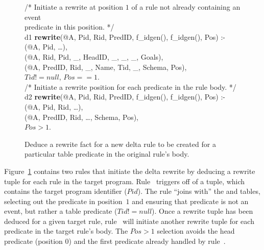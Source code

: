 \begin{figure}[!t]
\ssp
\centering
\begin{boxedminipage}{\linewidth}
/* Initiate a rewrite at position $1$ of a rule not already containing an event \\
   predicate in this position. */ \\
d1 {\bf rewrite}(@A, Pid, Rid, PredID, f\_idgen(), f\_idgen(), Pos) :- \\
(@A, Pid, \ldots), \\
(@A, Rid, Pid, \_, HeadID, \_, \_, \_, Goals), \\
(@A, PredID, Rid, \_, Name, Tid, \_, Schema, Pos), \\
\datalogspace $Tid != null$, $Pos == 1$. \\

/* Initiate a rewrite position for each predicate in the rule body. */ \\
d2 {\bf rewrite}(@A, Pid, Rid, PredID, f\_idgen(), f\_idgen(), Pos) :- \\
(@A, Pid, Rid, \ldots), \\
(@A, PredID, Rid, \ldots, Schema, Pos), \\
\datalogspace $Pos > 1$. \\

\end{boxedminipage}
\caption{\label{ch:evita:fig:delta1}Deduce a rewrite fact for a new delta rule to be
created for a particular table predicate in the original rule's body.}
\end{figure}

Figure~\ref{ch:evita:fig:delta1} contains two rules that initiate the delta
rewrite by deducing a rewrite tuple for each rule in the target program.
Rule~ triggers off of a  tuple, which contains the
target program identifier ($Pid$).  The rule ``joins with'' the  and
 tables, selecting out the predicate in position~$1$ and ensuring
that predicate is not an event, but rather a table predicate ($Tid != null$).
Once a rewrite tuple has been deduced for a given target rule, rule~
will initiate another rewrite tuple for each predicate in the target rule's
body.  The $Pos > 1$ selection avoids the head predicate (position $0$) and the
first predicate already handled by rule~.

